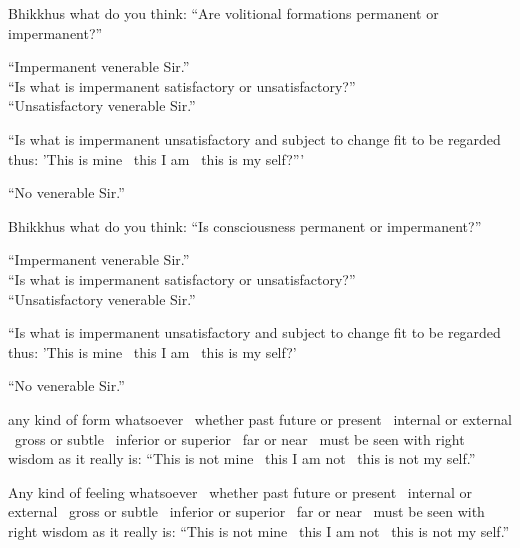 \begin{english-only-nohang}
Bhikkhus what do you think: ``Are volitional formations permanent or impermanent?''

``Impermanent venerable Sir.''\\

``Is what is impermanent satisfactory or unsatisfactory?'' \\

``Unsatisfactory venerable Sir.''\\

\begin{english-hangtogether}
``Is what is impermanent unsatisfactory and subject to change fit to be regarded thus: 'This is mine \breathmark\ this I am \breathmark\ this is my self?'''
\end{english-hangtogether}

``No venerable Sir.''
\end{english-only-nohang}

\begin{english-only-nohang}
Bhikkhus what do you think: ``Is consciousness permanent or impermanent?''

``Impermanent venerable Sir.''\\

``Is what is impermanent satisfactory or unsatisfactory?''\\

``Unsatisfactory venerable Sir.''\\

\begin{english-hangtogether}
``Is what is impermanent unsatisfactory and subject to change fit to be regarded thus: 'This is mine \breathmark\ this I am \breathmark\ this is my self?'
\end{english-hangtogether}

``No venerable Sir.''
\end{english-only-nohang}

\begin{english-only-hang}
 any kind of form whatsoever \breathmark\ whether past future or present \breathmark\ internal or external \breathmark\ gross or subtle \breathmark\ inferior or superior \breathmark\ far or near \breathmark\ must be seen with right wisdom as it really is: ``This is not mine \breathmark\ this I am not \breathmark\ this is not my self.''
\end{english-only-hang}

\begin{english-only-hang}
Any kind of feeling whatsoever \breathmark\ whether past future or present \breathmark\ internal or external \breathmark\ gross or subtle \breathmark\ inferior or superior \breathmark\ far or near \breathmark\ must be seen with right wisdom as it really is: ``This is not mine \breathmark\ this I am not \breathmark\ this is not my self.''
\end{english-only-hang}


